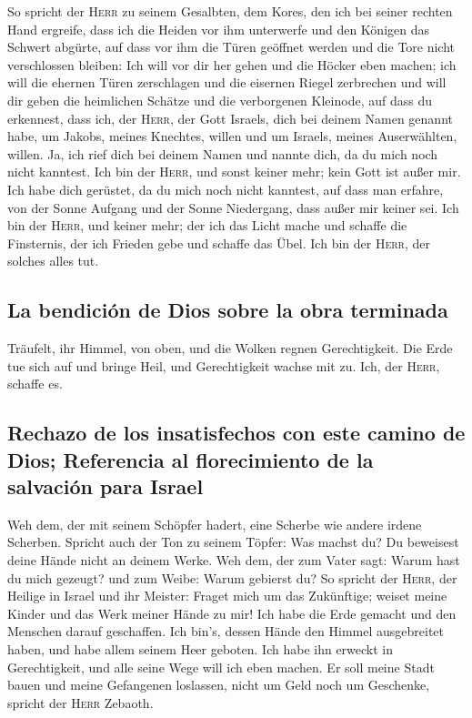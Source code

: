  So spricht der \textsc{Herr} zu seinem Gesalbten, dem
Kores, den ich bei seiner rechten Hand ergreife, dass ich die Heiden vor
ihm unterwerfe und den Königen das Schwert abgürte, auf dass vor ihm die
Türen geöffnet werden und die Tore nicht verschlossen bleiben:
 Ich will vor dir her gehen und die Höcker eben machen;
ich will die ehernen Türen zerschlagen und die eisernen Riegel
zerbrechen  und will dir geben die heimlichen Schätze und
die verborgenen Kleinode, auf dass du erkennest, dass ich, der
\textsc{Herr}, der Gott Israels, dich bei deinem Namen genannt habe,
 um Jakobs, meines Knechtes, willen und um Israels, meines
Auserwählten, willen. Ja, ich rief dich bei deinem Namen und nannte
dich, da du mich noch nicht kanntest.  Ich bin der
\textsc{Herr}, und sonst keiner mehr; kein Gott ist außer mir. Ich habe
dich gerüstet, da du mich noch nicht kanntest,  auf dass
man erfahre, von der Sonne Aufgang und der Sonne Niedergang, dass außer
mir keiner sei. Ich bin der \textsc{Herr}, und keiner mehr;
 der ich das Licht mache und schaffe die Finsternis, der
ich Frieden gebe und schaffe das Übel. Ich bin der \textsc{Herr}, der
solches alles tut.

\hypertarget{la-bendiciuxf3n-de-dios-sobre-la-obra-terminada}{%
\subsection{La bendición de Dios sobre la obra
terminada}\label{la-bendiciuxf3n-de-dios-sobre-la-obra-terminada}}

 Träufelt, ihr Himmel, von oben, und die Wolken regnen
Gerechtigkeit. Die Erde tue sich auf und bringe Heil, und Gerechtigkeit
wachse mit zu. Ich, der \textsc{Herr}, schaffe es.

\hypertarget{rechazo-de-los-insatisfechos-con-este-camino-de-dios-referencia-al-florecimiento-de-la-salvaciuxf3n-para-israel}{%
\subsection{Rechazo de los insatisfechos con este camino de Dios;
Referencia al florecimiento de la salvación para
Israel}\label{rechazo-de-los-insatisfechos-con-este-camino-de-dios-referencia-al-florecimiento-de-la-salvaciuxf3n-para-israel}}

 Weh dem, der mit seinem Schöpfer hadert, eine Scherbe wie
andere irdene Scherben. Spricht auch der Ton zu seinem Töpfer: Was
machst du? Du beweisest deine Hände nicht an deinem Werke.
 Weh dem, der zum Vater sagt: Warum hast du mich gezeugt?
und zum Weibe: Warum gebierst du?  So spricht der
\textsc{Herr}, der Heilige in Israel und ihr Meister: Fraget mich um das
Zukünftige; weiset meine Kinder und das Werk meiner Hände zu mir!
 Ich habe die Erde gemacht und den Menschen darauf
geschaffen. Ich bin's, dessen Hände den Himmel ausgebreitet haben, und
habe allem seinem Heer geboten.  Ich habe ihn erweckt in
Gerechtigkeit, und alle seine Wege will ich eben machen. Er soll meine
Stadt bauen und meine Gefangenen loslassen, nicht um Geld noch um
Geschenke, spricht der \textsc{Herr} Zebaoth.

